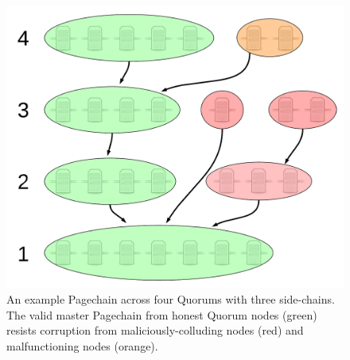 \documentclass{sig-alternate}
\begin{document}

\begin{figure}[h]
	\centering
	\includegraphics[width=0.85\linewidth]{../images/LucidCharts/Page-chain2.pdf}
	\caption{An example Pagechain across four Quorums with three side-chains. The valid master Pagechain from honest Quorum nodes (green) resists corruption from maliciously-colluding nodes (red) and malfunctioning nodes (orange).}
	\label{fig:sideChains}
\end{figure}
\end{document}
